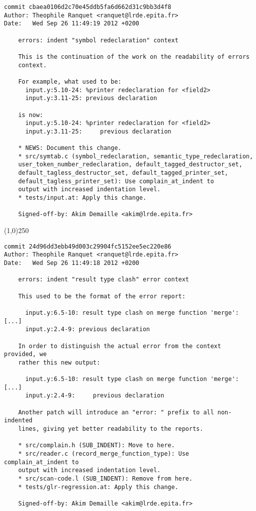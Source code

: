 \begin{verbatim}
commit cbaea0106d2c70e45ddb5fa6d662d31c9bb3d4f8
Author: Theophile Ranquet <ranquet@lrde.epita.fr>
Date:   Wed Sep 26 11:49:19 2012 +0200

    errors: indent "symbol redeclaration" context
    
    This is the continuation of the work on the readability of errors
    context.
    
    For example, what used to be:
      input.y:5.10-24: %printer redeclaration for <field2>
      input.y:3.11-25: previous declaration
    
    is now:
      input.y:5.10-24: %printer redeclaration for <field2>
      input.y:3.11-25:     previous declaration
    
    * NEWS: Document this change.
    * src/symtab.c (symbol_redeclaration, semantic_type_redeclaration,
    user_token_number_redeclaration, default_tagged_destructor_set,
    default_tagless_destructor_set, default_tagged_printer_set,
    default_tagless_printer_set): Use complain_at_indent to
    output with increased indentation level.
    * tests/input.at: Apply this change.
    
    Signed-off-by: Akim Demaille <akim@lrde.epita.fr>

\end{verbatim}
\line(1,0){250}
\begin{verbatim}
commit 24d96dd3ebb49d003c29904fc5152ee5ec220e86
Author: Theophile Ranquet <ranquet@lrde.epita.fr>
Date:   Wed Sep 26 11:49:18 2012 +0200

    errors: indent "result type clash" error context
    
    This used to be the format of the error report:
    
      input.y:6.5-10: result type clash on merge function 'merge': [...]
      input.y:2.4-9: previous declaration
    
    In order to distinguish the actual error from the context provided, we
    rather this new output:
    
      input.y:6.5-10: result type clash on merge function 'merge': [...]
      input.y:2.4-9:     previous declaration
    
    Another patch will introduce an "error: " prefix to all non-indented
    lines, giving yet better readability to the reports.
    
    * src/complain.h (SUB_INDENT): Move to here.
    * src/reader.c (record_merge_function_type): Use complain_at_indent to
    output with increased indentation level.
    * src/scan-code.l (SUB_INDENT): Remove from here.
    * tests/glr-regression.at: Apply this change.
    
    Signed-off-by: Akim Demaille <akim@lrde.epita.fr>

\end{verbatim}
